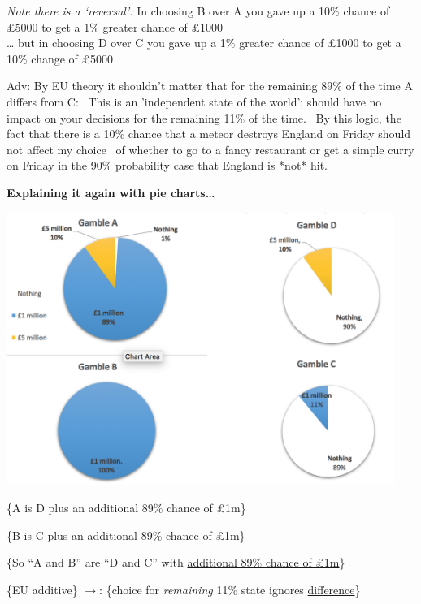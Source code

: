 \documentclass[]{article}
\begin{document}
\emph{Note there is a `reversal':} In choosing B over A you gave up a
10\% chance of \pounds5000 to get a 1\% greater chance of \pounds1000\\
\ldots{} but in choosing D over C you gave up a 1\% greater chance of
\pounds1000 to get a 10\% change of \pounds5000

\textcolor{RawSienna}{Adv: By EU theory it shouldn't matter that for the remaining 89\% of the time A differs from C: \
This is an 'independent state of the world'; should have no impact on your decisions for the remaining 11\% of the time. \
By this logic, the fact that there is a 10\% chance that a meteor destroys England on Friday should not affect my choice \
of whether to go to a fancy restaurant or get a simple curry on Friday in the 90\% probability case that England is *not* hit.}

\bigskip

\textbf{Explaining it again with pie charts\ldots{}}

\includegraphics[height=3.5in]{picsfigs/allaispies.png}

\medskip

\footnotesize\{A is D plus an additional 89\% chance of £1m\}

\bigskip

\footnotesize\{B is C plus an additional 89\% chance of £1m\}

\bigskip

\footnotesize\{So ``A and B'' are ``D and C'' with
\underline{additional 89\% chance of \pounds 1m}\}

\bigskip

\footnotesize\{EU additive\} \(\rightarrow\): \footnotesize\{choice for
\emph{remaining} 11\% state ignores \underline{difference}\}
\end{document}
